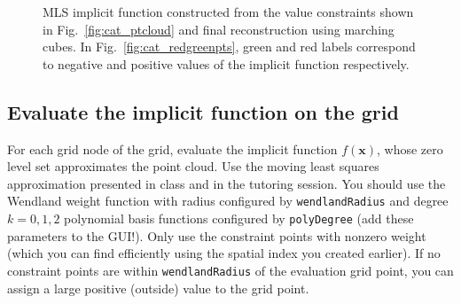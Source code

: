 \documentclass[11pt]{amsart}
\renewcommand{\vec}[1]{\mathbf{#1}}
\def\x{\vec{x}}
\begin{document}
\begin{figure}[h!]
   \centering
\hspace{1cm}
   \caption{MLS implicit function constructed from the value constraints shown
    in Fig.~\ref{fig:cat_ptcloud} and final reconstruction using marching cubes.
    In Fig.~\ref{fig:cat_redgreenpts}, green and red labels correspond to
    negative and positive values of the implicit function respectively.}
   \label{fig:cat_reconstr}
\end{figure}

\subsection{Evaluate the implicit function on the grid}
For each grid node of the grid, evaluate the implicit function $f(\x)$, whose
zero level set approximates the point cloud. Use the moving least squares
approximation presented in class and in the tutoring session. You should use the
Wendland weight function with radius configured by \texttt{wendlandRadius} and
degree $k = 0, 1, 2$ polynomial basis functions configured by
\texttt{polyDegree} (add these parameters to the GUI!). Only use the constraint
points with nonzero weight (which you can find efficiently using the spatial
index you created earlier). If no constraint points are within
\texttt{wendlandRadius} of the evaluation grid point, you can assign a large
positive (outside) value to the grid point.
\end{document}
